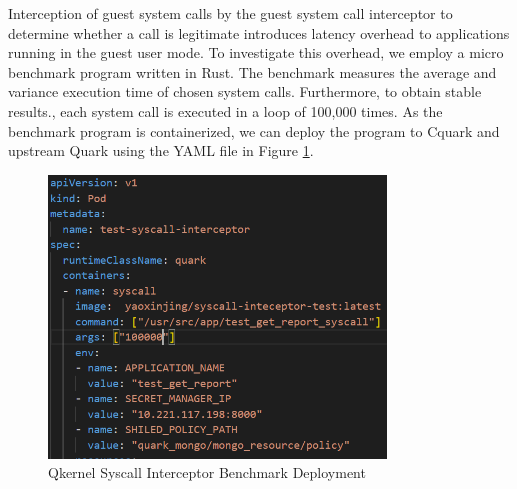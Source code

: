 Interception of guest system calls by the guest system call interceptor to determine whether a call is legitimate introduces latency overhead to applications running in the guest user mode.  To investigate this overhead, we employ a micro benchmark program written in Rust.  The benchmark measures the average and variance execution time of chosen system calls. Furthermore, to obtain stable results., each system call is executed in a loop of 100,000 times. As the benchmark program is containerized, we can deploy the program to Cquark and upstream Quark using the YAML file in Figure \ref{fig:syscall_interceptor_yaml}.
\begin{figure}[H]
    \centering
    \includegraphics[width=0.8\textwidth]{images/perf_system_call_interceptor_yaml.PNG}
    \caption[Qkernel Syscall Interceptor Benchmark Deployment]{Qkernel Syscall Interceptor Benchmark Deployment}
    \label{fig:syscall_interceptor_yaml}
\end{figure}


